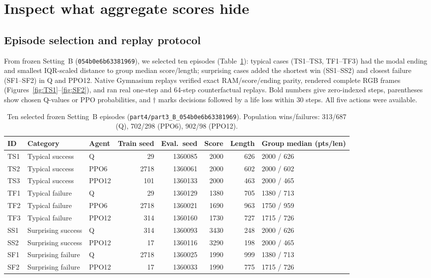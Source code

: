 \setcounter{section}{3}
\section{Inspect what aggregate scores hide}
\label{sec:episodes}

\subsection{Episode selection and replay protocol}
From frozen Setting~B (\texttt{054b0e6b63381969}), we selected ten episodes (Table~\ref{tab:part4-cases}):
typical cases (TS1--TS3, TF1--TF3) had the modal ending and smallest IQR-scaled distance to group
median score/length; surprising cases added the shortest win (SS1--SS2) and closest failure (SF1--SF2)
in Q and PPO12. Native Gymnasium replays verified exact RAM/score/ending parity, rendered complete RGB
frames (Figures~\ref{fig:TS1}--\ref{fig:SF2}), and ran real one-step and 64-step counterfactual replays.
Bold numbers give zero-indexed steps, parentheses show chosen Q-values or PPO probabilities, and
$\dagger$ marks decisions followed by a life loss within 30 steps. All five actions were available.

\begin{table}[H]
\centering\small
\begin{tabular}{@{}lllrrrrl@{}}
\toprule
ID & Category & Agent & Train seed & Eval.\ seed & Score & Length & Group median (pts/len) \\
\midrule
TS1 & Typical success & Q     &   29 & 1360085 & 2000 & 626 & 2000 / 626 \\
TS2 & Typical success & PPO6  & 2718 & 1360061 & 2000 & 602 & 2000 / 602 \\
TS3 & Typical success & PPO12 &  101 & 1360133 & 2000 & 463 & 2000 / 465 \\
TF1 & Typical failure & Q     &   29 & 1360129 & 1380 & 705 & 1380 / 713 \\
TF2 & Typical failure & PPO6  & 2718 & 1360021 & 1690 & 963 & 1750 / 959 \\
TF3 & Typical failure & PPO12 &  314 & 1360160 & 1730 & 727 & 1715 / 726 \\
SS1 & Surprising success & Q     &  314 & 1360093 & 3430 & 248 & 2000 / 626 \\
SS2 & Surprising success & PPO12 &   17 & 1360116 & 3290 & 198 & 2000 / 465 \\
SF1 & Surprising failure & Q     & 2718 & 1360025 & 1990 & 999 & 1380 / 713 \\
SF2 & Surprising failure & PPO12 &   17 & 1360033 & 1990 & 775 & 1715 / 726 \\
\bottomrule
\end{tabular}
\caption{Ten selected frozen Setting~B episodes (\texttt{part4/part3\_B\_054b0e6b63381969}). Population wins/failures: 313/687 (Q), 702/298 (PPO6), 902/98 (PPO12).}
\label{tab:part4-cases}
\end{table}

